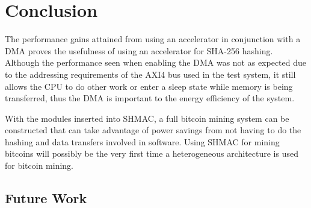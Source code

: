 \chapter{Conclusion}

The performance gains attained from using an accelerator in conjunction with a DMA
proves the usefulness of using an accelerator for SHA-256 hashing. Although the
performance seen when enabling the DMA was not as expected due to the addressing
requirements of the AXI4 bus used in the test system, it still allows the CPU to
do other work or enter a sleep state while memory is being transferred, thus
the DMA is important to the energy efficiency of the system.

With the modules inserted into SHMAC, a full bitcoin mining system can be
constructed that can take advantage of power savings from not having to do
the hashing and data transfers involved in software. Using SHMAC for mining
bitcoins will possibly be the very first time a heterogeneous architecture
is used for bitcoin mining.

\section{Future Work}
\label{sec:future-work}


